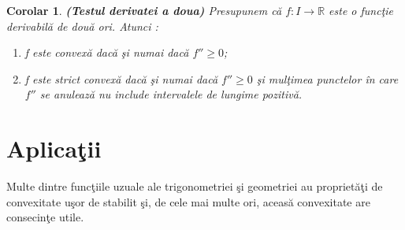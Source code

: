 \documentclass[a4paper,12pt,oneside]{report}
\newtheorem{corollary}{Corolar}
\begin{document}
 \begin{corollary} \textbf{(Testul derivatei a doua)}
  Presupunem c\u{a} \(f : I \rightarrow \mathbb{R}\) este o func\c{t}ie derivabil\u{a} de dou\u{a} ori. Atunci :
\begin{enumerate}
    \item f este convex\u{a} dac\u{a} \c{s}i numai dac\u{a} \({f}''\geq 0\);
    \item  f este strict convex\u{a} dac\u{a} \c{s}i numai dac\u{a} \({f}''\geq 0\) \c{s}i mul\c{t}imea punctelor \^{i}n care \({f}''\) se anuleaz\u{a} nu include intervalele de lungime pozitiv\u{a}.
\end{enumerate}
 \end{corollary}





%
%
%
%


\chapter{Aplica\c{t}ii}

\nocite{steele}
\nocite{pop}
\nocite{siretchi}

Multe dintre func\c{t}iile uzuale ale trigonometriei \c{s}i geometriei au propriet\u{a}\c{t}i de convexitate u\c{s}or de stabilit \c{s}i, de cele mai multe ori, aceas\u{a} convexitate are consecinţe utile.
\end{document}
